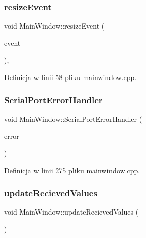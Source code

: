 \subsubsection{\texorpdfstring{resize\+Event}{resizeEvent}}
{\footnotesize\ttfamily void Main\+Window\+::resize\+Event (\begin{DoxyParamCaption}\item[{Q\+Resize\+Event $\ast$}]{event }\end{DoxyParamCaption})\hspace{0.3cm}{\ttfamily [private]}, {\ttfamily [slot]}}



Definicja w linii 58 pliku mainwindow.\+cpp.

\mbox{\label{class_main_window_a282b4cae4900448d6ce21598c50c58a8}} 
\subsubsection{\texorpdfstring{Serial\+Port\+Error\+Handler}{SerialPortErrorHandler}}
{\footnotesize\ttfamily void Main\+Window\+::\+Serial\+Port\+Error\+Handler (\begin{DoxyParamCaption}\item[{Q\+Serial\+Port\+::\+Serial\+Port\+Error}]{error }\end{DoxyParamCaption})\hspace{0.3cm}{\ttfamily [slot]}}



Definicja w linii 275 pliku mainwindow.\+cpp.

\mbox{\label{class_main_window_a5aac21b5760e96b276d89fa73d20c279}} 
\subsubsection{\texorpdfstring{update\+Recieved\+Values}{updateRecievedValues}}
{\footnotesize\ttfamily void Main\+Window\+::update\+Recieved\+Values (\begin{DoxyParamCaption}{ }\end{DoxyParamCaption})\hspace{0.3cm}{\ttfamily [slot]}}

